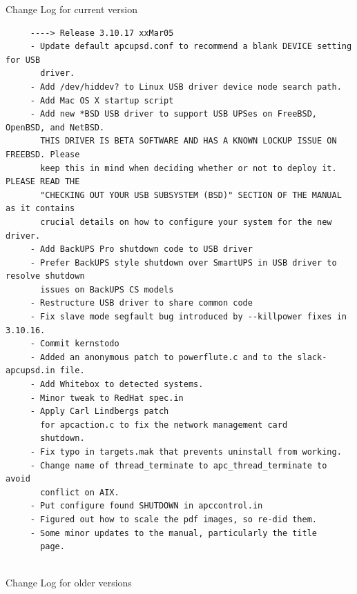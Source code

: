 Change Log for current version 

\footnotesize
\begin{verbatim}
     ----> Release 3.10.17 xxMar05
     - Update default apcupsd.conf to recommend a blank DEVICE setting for USB
       driver.
     - Add /dev/hiddev? to Linux USB driver device node search path.
     - Add Mac OS X startup script
     - Add new *BSD USB driver to support USB UPSes on FreeBSD, OpenBSD, and NetBSD.
       THIS DRIVER IS BETA SOFTWARE AND HAS A KNOWN LOCKUP ISSUE ON FREEBSD. Please
       keep this in mind when deciding whether or not to deploy it. PLEASE READ THE
       "CHECKING OUT YOUR USB SUBSYSTEM (BSD)" SECTION OF THE MANUAL as it contains
       crucial details on how to configure your system for the new driver.
     - Add BackUPS Pro shutdown code to USB driver
     - Prefer BackUPS style shutdown over SmartUPS in USB driver to resolve shutdown
       issues on BackUPS CS models
     - Restructure USB driver to share common code
     - Fix slave mode segfault bug introduced by --killpower fixes in 3.10.16.
     - Commit kernstodo
     - Added an anonymous patch to powerflute.c and to the slack-apcupsd.in file.
     - Add Whitebox to detected systems.
     - Minor tweak to RedHat spec.in
     - Apply Carl Lindbergs patch
       for apcaction.c to fix the network management card
       shutdown.
     - Fix typo in targets.mak that prevents uninstall from working.
     - Change name of thread_terminate to apc_thread_terminate to avoid
       conflict on AIX.
     - Put configure found SHUTDOWN in apccontrol.in
     - Figured out how to scale the pdf images, so re-did them.
     - Some minor updates to the manual, particularly the title
       page.
     
\end{verbatim}
\normalsize

Change Log for older versions 

